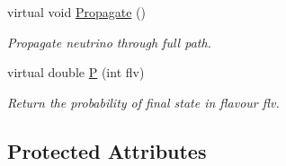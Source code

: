 \begin{DoxyCompactItemize}
virtual void \hyperlink{classOscProb_1_1PMNS__Base_a054e3a8b05b9a958b6fa416e4a835e3e}{Propagate} ()
\begin{DoxyCompactList}\small\item\em Propagate neutrino through full path. \end{DoxyCompactList}\item 
virtual double \hyperlink{classOscProb_1_1PMNS__Base_a0dc4d45bc3d7e03b9abbf5b4e100cc22}{P} (int flv)
\begin{DoxyCompactList}\small\item\em Return the probability of final state in flavour flv. \end{DoxyCompactList}\end{DoxyCompactItemize}
\subsection*{Protected Attributes}
